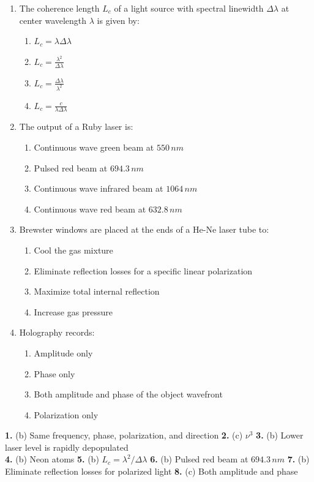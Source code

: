 \begin{enumerate}
    \item The coherence length $L_c$ of a light source with spectral linewidth $\Delta \lambda$ at center wavelength $\lambda$ is given by:
    \begin{enumerate}
        \item $L_c = \lambda \Delta \lambda$
        \item $L_c = \frac{\lambda^2}{\Delta \lambda}$
        \item $L_c = \frac{\Delta \lambda}{\lambda^2}$
        \item $L_c = \frac{c}{\lambda \Delta \lambda}$
    \end{enumerate}
    
    \item The output of a Ruby laser is:
    \begin{enumerate}
        \item Continuous wave green beam at $550\,\si{nm}$
        \item Pulsed red beam at $694.3\,\si{nm}$
        \item Continuous wave infrared beam at $1064\,\si{nm}$
        \item Continuous wave red beam at $632.8\,\si{nm}$
    \end{enumerate}
    
    \item Brewster windows are placed at the ends of a He-Ne laser tube to:
    \begin{enumerate}
        \item Cool the gas mixture
        \item Eliminate reflection losses for a specific linear polarization
        \item Maximize total internal reflection
        \item Increase gas pressure
    \end{enumerate}
    
    \item Holography records:
    \begin{enumerate}
        \item Amplitude only
        \item Phase only
        \item Both amplitude and phase of the object wavefront
        \item Polarization only
    \end{enumerate}
\end{enumerate}

\begin{solutionbox}
\textbf{1.} (b) Same frequency, phase, polarization, and direction \quad \textbar\quad
\textbf{2.} (c) $\nu^3$ \quad \textbar\quad
\textbf{3.} (b) Lower laser level is rapidly depopulated \\
\textbf{4.} (b) Neon atoms \quad \textbar\quad
\textbf{5.} (b) $L_c = \lambda^2 / \Delta \lambda$ \quad \textbar\quad
\textbf{6.} (b) Pulsed red beam at $694.3\,\si{nm}$ \quad \textbar\quad
\textbf{7.} (b) Eliminate reflection losses for polarized light \quad \textbar\quad
\textbf{8.} (c) Both amplitude and phase
\end{solutionbox}

